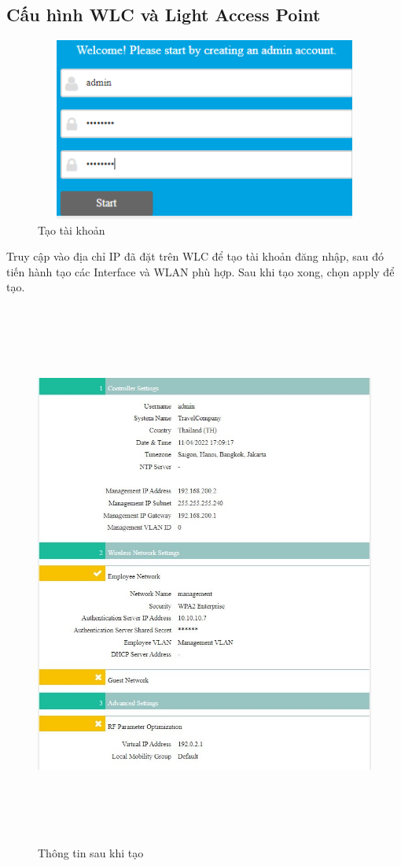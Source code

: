 \documentclass[a4paper, 12pt]{article}
\begin{document}
\subsection{Cấu hình WLC và Light Access Point }
\begin{figure}[H]
    \centering
    \includegraphics[width=12cm, height=6cm]{img/4.6a.png}
    \caption{Tạo tài khoản }
    \label{hinh46a}
\end{figure}
\hspace*{1cm}Truy cập vào địa chỉ IP đã đặt trên WLC để tạo tài khoản đăng nhập, sau đó tiến hành tạo các Interface và WLAN phù hợp. Sau khi tạo xong, chọn apply để tạo.\\
\begin{figure}[H]
    \centering
    \includegraphics[width=16cm, height=18cm]{img/4.6b.jpg}
    \caption{Thông tin sau khi tạo }
    \label{hinh46b}
\end{figure}
\end{document}
